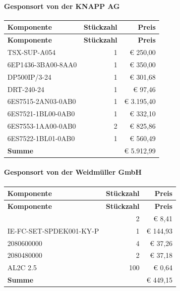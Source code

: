 \paragraph{Gesponsort von der KNAPP AG}
\begin{longtable}{|p{7cm}|r|r|}
    \hline
    \textbf{Komponente} & \textbf{Stückzahl} & \textbf{Preis} \\
    \hline
    \endfirsthead

    \hline
    \textbf{Komponente} & \textbf{Stückzahl} & \textbf{Preis} \\
    \hline
    \endhead

    \hline
    \endfoot

    \hline
    \endlastfoot
    \hline
    \hline
    TSX-SUP-A054 & 1 & € 250,00 \\
    6EP1436-3BA00-8AA0 & 1 & € 350,00 \\
    DP500IP/3-24 & 1 & € 301,68 \\
    DRT-240-24 & 1 & € 97,46 \\
    6ES7515-2AN03-0AB0 & 1 & € 3.195,40 \\
    6ES7521-1BL00-0AB0 & 1 & € 332,10 \\
    6ES7553-1AA00-0AB0 & 2 & € 825,86 \\
    6ES7522-1BL01-0AB0 & 1 & € 560,49 \\
    \textbf{Summe} & & € 5.912,99\\
\end{longtable}
\paragraph{Gesponsort von der Weidmüller GmbH}
\begin{longtable}{|p{7cm}|r|r|}
    \hline
    \textbf{Komponente} & \textbf{Stückzahl} & \textbf{Preis} \\
    \hline
    \endfirsthead

    \hline
    \textbf{Komponente} & \textbf{Stückzahl} & \textbf{Preis} \\
    \hline
    \endhead

    \hline
    \endfoot

    \hline
    \endlastfoot
    \hline
    \hline
    2081870000 & 2 & € 8,41 \\
    IE-FC-SET-SPDEK001-KY-P & 1 & € 144,93 \\
    2080600000 & 4 & € 37,26 \\
    2080480000 & 2 & € 37,18 \\
    AL2C 2.5 & 100 & € 0,64 \\
    \textbf{Summe} & & € 449,15\\
\end{longtable}
